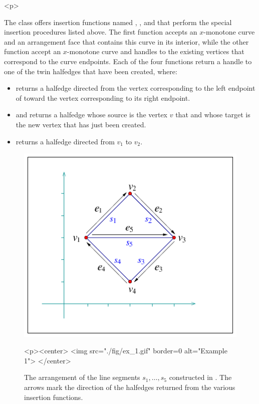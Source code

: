 \begin{ccHtmlOnly}<p>\end{ccHtmlOnly}
The  class offers insertion functions named
, ,
 and 
that perform the special insertion procedures listed above. The
first function accepts an $x$-monotone curve and an arrangement
face that contains this curve in its interior, while the other
function accept an $x$-monotone curve and handles to the existing
vertices that correspond to the curve endpoints. Each of the four
functions return a handle to one of the twin halfedges that have
been created, where:
\begin{itemize}
\item {} returns a halfedge directed
from the vertex corresponding to the left endpoint of 
toward the vertex corresponding to its right endpoint.
%
\item {} and
 returns a halfedge whose
source is the vertex $v$ that and whose target is the new vertex
that has just been created.
%
\item {} returns a halfedge directed
from $v_1$ to $v_2$.
\end{itemize}

\begin{figure}[!htp]
\begin{ccTexOnly}
  \begin{center}
  \includegraphics{Arrangement_2/fig/ex_1}
  \end{center}
\end{ccTexOnly}
\begin{ccHtmlOnly}
  <p><center>
  <img src="./fig/ex_1.gif" border=0 alt="Example 1">
  </center>
\end{ccHtmlOnly}
\caption{The arrangement of the line segments $s_1, \ldots, s_5$
constructed in . The arrows mark the direction of
the halfedges returned from the various insertion functions.}
\label{arr_fig:ex_1}
\end{figure}


